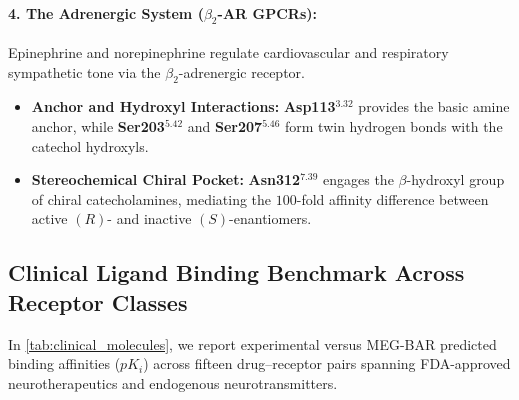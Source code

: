 \documentclass{article}
\theoremstyle{definition}
\begin{document}
\paragraph{4. The Adrenergic System ($\beta_2$-AR GPCRs):}
Epinephrine and norepinephrine regulate cardiovascular and respiratory sympathetic tone via the $\beta_2$-adrenergic receptor.
\begin{itemize}[leftmargin=1.5em,noitemsep]
    \item \textbf{Anchor and Hydroxyl Interactions:} \textbf{Asp113$^{3.32}$} provides the basic amine anchor, while \textbf{Ser203$^{5.42}$} and \textbf{Ser207$^{5.46}$} form twin hydrogen bonds with the catechol hydroxyls.
    \item \textbf{Stereochemical Chiral Pocket:} \textbf{Asn312$^{7.39}$} engages the $\beta$-hydroxyl group of chiral catecholamines, mediating the $100$-fold affinity difference between active $(R)$- and inactive $(S)$-enantiomers.
\end{itemize}

\subsection{Clinical Ligand Binding Benchmark Across Receptor Classes}

In \cref{tab:clinical_molecules}, we report experimental versus MEG-BAR predicted binding affinities ($pK_i$) across fifteen drug--receptor pairs spanning FDA-approved neurotherapeutics and endogenous neurotransmitters.
\end{document}
